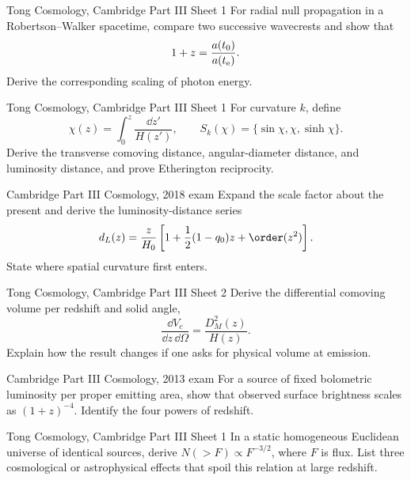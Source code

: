 \begin{exercises}

\begin{exercise}{Tong Cosmology, Cambridge Part III Sheet 1}
For radial null propagation in a Robertson--Walker spacetime, compare two
successive wavecrests and show that
\[
1+z=\frac{a(t_0)}{a(t_{\rm e})}.
\]
Derive the corresponding scaling of photon energy.
\end{exercise}

\begin{exercise}{Tong Cosmology, Cambridge Part III Sheet 1}
For curvature \(k\), define
\[
\chi(z)=\int_0^z\frac{\dd z'}{H(z')},\qquad
S_k(\chi)=\{\sin\chi,\chi,\sinh\chi\}.
\]
Derive the transverse comoving distance, angular-diameter distance, and
luminosity distance, and prove Etherington reciprocity.
\end{exercise}

\begin{exercise}{Cambridge Part III Cosmology, 2018 exam}
Expand the scale factor about the present and derive the luminosity-distance
series
\[
d_L(z)=\frac{z}{H_0}
\left[1+\frac12(1-q_0)z+\order(z^2)\right].
\]
State where spatial curvature first enters.
\end{exercise}

\begin{exercise}{Tong Cosmology, Cambridge Part III Sheet 2}
Derive the differential comoving volume per redshift and solid angle,
\[
\frac{\dd V_c}{\dd z\,\dd\Omega}
=\frac{D_M^2(z)}{H(z)}.
\]
Explain how the result changes if one asks for physical volume at emission.
\end{exercise}

\begin{exercise}{Cambridge Part III Cosmology, 2013 exam}
For a source of fixed bolometric luminosity per proper emitting area, show
that observed surface brightness scales as \((1+z)^{-4}\).  Identify the four
powers of redshift.
\end{exercise}

\begin{exercise}{Tong Cosmology, Cambridge Part III Sheet 1}
In a static homogeneous Euclidean universe of identical sources, derive
\(N(>F)\propto F^{-3/2}\), where \(F\) is flux.  List three cosmological or
astrophysical effects that spoil this relation at large redshift.
\end{exercise}


\end{exercises}
